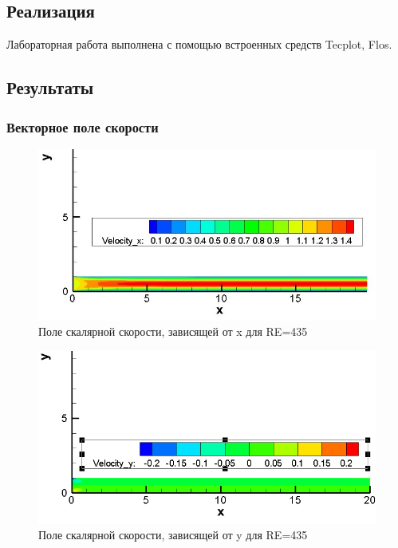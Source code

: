 \documentclass[12pt, a4paper]{article}
\begin{document}
\subsection{Реализация}
Лабораторная работа выполнена с помощью встроенных средств Tecplot, Flos.

\subsection{Результаты}

\subsubsection{Векторное поле скорости}
\begin{figure}[H]
    \centering
    \includegraphics[scale = 0.8]{figure/RE135_Velocity_x.jpg}
    \caption{Поле скалярной скорости, зависящей от x для RE=435}
    \label{pic1}
\end{figure}

\begin{figure}[H]
    \centering
    \includegraphics[scale = 0.8]{figure/RE135_Velocity_y.png}
    \caption{Поле скалярной скорости, зависящей от y для RE=435}
    \label{pic2}
\end{figure}
\end{document}
